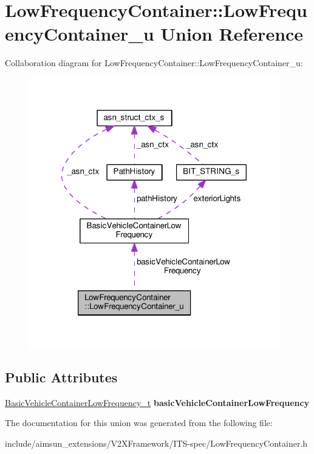 \hypertarget{unionLowFrequencyContainer_1_1LowFrequencyContainer__u}{}\section{Low\+Frequency\+Container\+:\+:Low\+Frequency\+Container\+\_\+u Union Reference}
\label{unionLowFrequencyContainer_1_1LowFrequencyContainer__u}


Collaboration diagram for Low\+Frequency\+Container\+:\+:Low\+Frequency\+Container\+\_\+u\+:\nopagebreak
\begin{figure}[H]
\begin{center}
\leavevmode
\includegraphics[width=308pt]{unionLowFrequencyContainer_1_1LowFrequencyContainer__u__coll__graph}
\end{center}
\end{figure}
\subsection*{Public Attributes}
\begin{DoxyCompactItemize}
\item 
\hyperlink{structBasicVehicleContainerLowFrequency}{Basic\+Vehicle\+Container\+Low\+Frequency\+\_\+t} {\bfseries basic\+Vehicle\+Container\+Low\+Frequency}\hypertarget{unionLowFrequencyContainer_1_1LowFrequencyContainer__u_adefcf3b6eadbe421162a6d1bbf425399}{}\label{unionLowFrequencyContainer_1_1LowFrequencyContainer__u_adefcf3b6eadbe421162a6d1bbf425399}

\end{DoxyCompactItemize}


The documentation for this union was generated from the following file\+:\begin{DoxyCompactItemize}
\item 
include/aimsun\+\_\+extensions/\+V2\+X\+Framework/\+I\+T\+S-\/spec/Low\+Frequency\+Container.\+h\end{DoxyCompactItemize}
